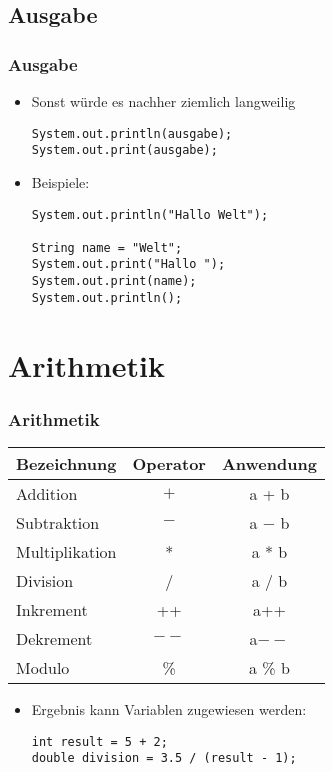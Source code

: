 \documentclass[final]{beamer}
\begin{document}
\subsection{Ausgabe}
\begin{frame}[fragile]
  \frametitle{Ausgabe}
  \begin{itemize}
    \item Sonst würde es nachher ziemlich langweilig
    \begin{lstlisting}[morekeywords={type}]
System.out.println(ausgabe);
System.out.print(ausgabe);
    \end{lstlisting}
    \item Beispiele:
    \begin{lstlisting}[morekeywords={type}]
System.out.println("Hallo Welt");

String name = "Welt";
System.out.print("Hallo ");
System.out.print(name);
System.out.println();
\end{lstlisting}
  \end{itemize}
\end{frame}

\section{Arithmetik}
\begin{frame}[fragile]
  \frametitle{Arithmetik}
  \begin{center}
  \begin{tabular}{l|c|c}
    \textbf{Bezeichnung} & \textbf{Operator}& \textbf{Anwendung}\\
    \hline
    Addition       & $+$  & a + b   \\
    Subtraktion    & $-$  & a $-$ b \\
    Multiplikation & *    & a * b   \\
    Division       & /    & a / b   \\
    Inkrement      & ++   & a++     \\
    Dekrement      & $--$ & a$--$   \\
    Modulo         & \%   & a \% b  \\
  \end{tabular}
  \end{center}

  \begin{itemize}
    \item[] Ergebnis kann Variablen zugewiesen werden:
    \begin{lstlisting}[morekeywords={type}]
int result = 5 + 2;
double division = 3.5 / (result - 1);
    \end{lstlisting}
  \end{itemize}
\end{frame}
\end{document}
